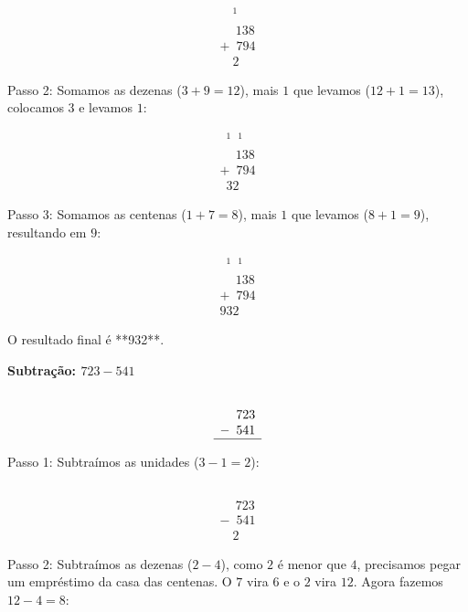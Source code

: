 \begin{enumerate}
		\[
		\begin{array}{r}
			\phantom{1} \phantom{1}^1 \\
			\phantom{+}138 \\
			+ \phantom{0}794 \\
			\hline
			\phantom{0} \phantom{0}2
		\end{array}
		\]
		
		Passo 2: Somamos as dezenas (\(3 + 9 = 12\)), mais \(1\) que levamos (\(12 + 1 = 13\)), colocamos \(3\) e levamos \(1\):
		
		\[
		\begin{array}{r}
			\phantom{1}^1 \phantom{1}^1 \\
			\phantom{+}138 \\
			+ \phantom{0}794 \\
			\hline
			\phantom{0} 3 2
		\end{array}
		\]
		
		Passo 3: Somamos as centenas (\(1 + 7 = 8\)), mais \(1\) que levamos (\(8 + 1 = 9\)), resultando em \(9\):
		
		\[
		\begin{array}{r}
			\phantom{1}^1 \phantom{1}^1 \\
			\phantom{+}138 \\
			+ \phantom{0}794 \\
			\hline
			9 3 2
		\end{array}
		\]
		
		O resultado final é **932**.

	
	\textbf{Subtração: \(723 - 541\)}
	
	\[
	\begin{array}{r}
		\phantom{1} \phantom{1} \phantom{1} \\
		\phantom{-}723 \\
		- \phantom{0}541 \\
		\hline
	\end{array}
	\]
	
	Passo 1: Subtraímos as unidades (\(3 - 1 = 2\)):
	
	\[
	\begin{array}{r}
		\phantom{1} \phantom{1} \phantom{1} \\
		\phantom{-}723 \\
		- \phantom{0}541 \\
		\hline
		\phantom{0} \phantom{0}2
	\end{array}
	\]
	
	Passo 2: Subtraímos as dezenas (\(2 - 4\)), como \(2\) é menor que \(4\), precisamos pegar um empréstimo da casa das centenas. O \(7\) vira \(6\) e o \(2\) vira \(12\). Agora fazemos \(12 - 4 = 8\):
	

\end{enumerate}
